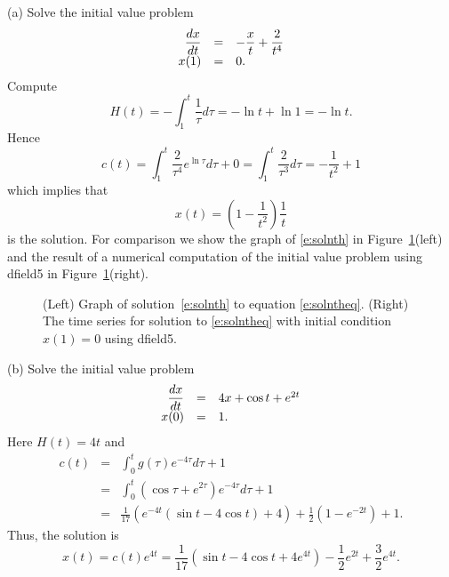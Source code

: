 \documentclass{ximera}
\begin{document}
(a)   Solve the initial value problem
\begin{equation} \label{e:solntheq}
\begin{array}{rcl}
\displaystyle \frac{dx}{dt} & = & -\displaystyle \frac{x}{t} + \frac{2}{t^4}\\
x(1) & = & 0.
\end{array}
\end{equation}
Compute
\[
H(t)= -\int_1^t\frac{1}{\tau}d\tau = -\ln t +\ln 1 = -\ln t.
\]
Hence 
\[
c(t)=\int_1^t \frac{2}{\tau^4}e^{\ln\tau}d\tau + 0
=\int_1^t \frac{2}{\tau^3} d\tau = -\frac{1}{t^2}+1
\]
which implies that 
\begin{equation}  \label{e:solnth}
x(t)=\left(1-\frac{1}{t^2}\right)\frac{1}{t}
\end{equation}
is the solution. For comparison we show the graph of \eqref{e:solnth} in 
Figure~\ref{F:solnmd}(left) and the result of a numerical computation of 
the initial value problem using {\sf dfield5} 
in Figure~\ref{F:solnmd}(right).

\begin{figure}[htb]
           \centerline{%
           }
           \caption{(Left) Graph of solution~\protect\eqref{e:solnth} to equation 
	\protect\eqref{e:solntheq}. (Right) The time series for solution to 
	\protect\eqref{e:solntheq} with initial condition $x(1)=0$ using 
	{\sf dfield5}.}
           \label{F:solnmd}
\end{figure}

\noindent (b) Solve the initial value problem
\[
\begin{array}{rcl}
\displaystyle \frac{dx}{dt} & = & 4x + \cos t + e^{2t} \\
x(0) & = & 1.
\end{array}
\]
Here $H(t)=4t$ and 
\begin{eqnarray*}
c(t) & = &  \int_0^t g(\tau)e^{-4\tau} d\tau +1\\
& = & \int_0^t \left(\cos\tau + e^{2\tau}\right)e^{-4\tau} d\tau
+1\\
& = & \frac{1}{17}\left( e^{-4t}(\sin t - 4\cos t)+4\right) +
\frac{1}{2}\left(1-e^{-2t}\right) + 1.
\end{eqnarray*}
Thus, the solution is
\[
x(t)=c(t) e^{4t} = \frac{1}{17}(\sin t - 4\cos t+4e^{4t}) -
\frac{1}{2}e^{2t} + \frac{3}{2}e^{4t}.
\]


\EXER

\TEXER 
\end{document}
